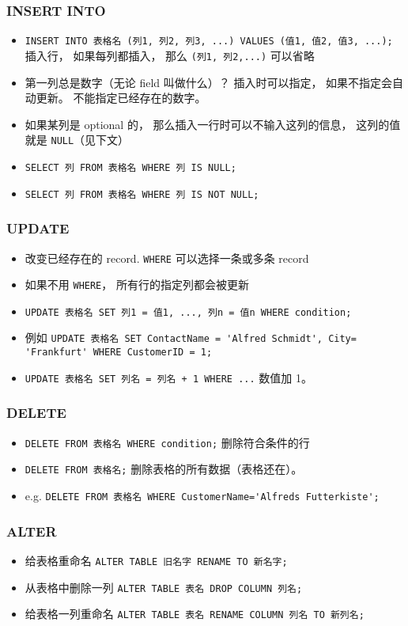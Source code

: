 \subsubsection{INSERT INTO}
\begin{itemize}
\item \verb`INSERT INTO 表格名 (列1, 列2, 列3, ...) VALUES (值1, 值2, 值3, ...);` 插入行， 如果每列都插入， 那么 \verb`(列1, 列2,...)` 可以省略
\item 第一列总是数字（无论 field 叫做什么）？ 插入时可以指定，  如果不指定会自动更新。 不能指定已经存在的数字。
\item 如果某列是 optional 的， 那么插入一行时可以不输入这列的信息， 这列的值就是 \verb`NULL`（见下文）
\item \verb`SELECT 列 FROM 表格名 WHERE 列 IS NULL;`
\item \verb`SELECT 列 FROM 表格名 WHERE 列 IS NOT NULL;`
\end{itemize}

\subsubsection{UPDATE}
\begin{itemize}
\item 改变已经存在的 record. \verb|WHERE| 可以选择一条或多条 record
\item 如果不用 \verb`WHERE`， 所有行的指定列都会被更新
\item \verb`UPDATE 表格名 SET 列1 = 值1, ..., 列n = 值n WHERE condition;`
\item 例如 \verb`UPDATE 表格名 SET ContactName = 'Alfred Schmidt', City= 'Frankfurt' WHERE CustomerID = 1;`
\item \verb|UPDATE 表格名 SET 列名 = 列名 + 1 WHERE ...| 数值加 1。
\end{itemize}

\subsubsection{DELETE}
\begin{itemize}
\item \verb`DELETE FROM 表格名 WHERE condition;` 删除符合条件的行
\item \verb|DELETE FROM 表格名;| 删除表格的所有数据（表格还在）。
\item e.g. \verb`DELETE FROM 表格名 WHERE CustomerName='Alfreds Futterkiste';`
\end{itemize}

\subsubsection{ALTER}
\begin{itemize}
\item 给表格重命名 \verb|ALTER TABLE 旧名字 RENAME TO 新名字;|
\item 从表格中删除一列 \verb|ALTER TABLE 表名 DROP COLUMN 列名;|
\item 给表格一列重命名 \verb|ALTER TABLE 表名 RENAME COLUMN 列名 TO 新列名;|
\end{itemize}

